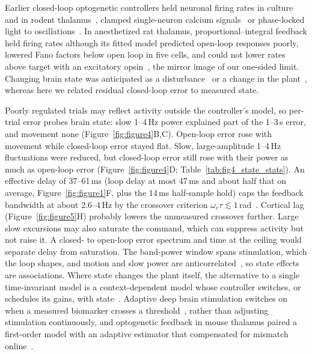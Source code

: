 Earlier closed-loop optogenetic controllers held neuronal firing rates in culture and in rodent thalamus~\citep{newman2015optogenetic,bolus2018design,bolus2021state}, clamped single-neuron calcium signals~\citep{Zhang2018} or phase-locked light to oscillations~\citep{nicholson2018analogue,kanta2019closed,Zaaimi2022}.
In anesthetized rat thalamus, proportional--integral feedback held firing rates although its fitted model predicted open-loop responses poorly, lowered Fano factors below open loop in five cells, and could not lower rates above target with an excitatory opsin~\citep{bolus2018design}, the mirror image of our one-sided limit.
Changing brain state was anticipated as a disturbance~\citep{bolus2021state} or a change in the plant~\citep{grosenick2015closed}, whereas here we related residual closed-loop error to measured state.

Poorly regulated trials may reflect activity outside the controller's model, so per-trial error probes brain state: slow 1--4\,Hz power explained part of the 1--3\,s error, and movement none (Figure~\ref{fig:figure4}B,C).
Open-loop error rose with movement while closed-loop error stayed flat.
Slow, large-amplitude 1--4\,Hz fluctuations were reduced, but closed-loop error still rose with their power as much as open-loop error (Figure~\ref{fig:figure4}D; Table~\ref{tab:fig4_state_stats}).
An effective delay of 37--61\,ms (loop delay at most 47\,ms and about half that on average, Figure~\ref{fig:figure1}F, plus the 14\,ms half-sample hold) caps the feedback bandwidth at about 2.6--4\,Hz by the crossover criterion $\omega_c\tau \lesssim 1$\,rad~\citep{skogestad2005multivariable}.
Cortical lag (Figure~\ref{fig:figure5}H) probably lowers the unmeasured crossover further.
Large slow excursions may also saturate the command, which can suppress activity but not raise it.
A closed- to open-loop error spectrum and time at the ceiling would separate delay from saturation.
The band-power window spans stimulation, which the loop shapes, and motion and slow power are anticorrelated~\citep{McGinley2015waking}, so state effects are associations.
Where state changes the plant itself, the alternative to a single time-invariant model is a context-dependent model whose controller switches, or schedules its gains, with state~\citep{rugh2000research,grosenick2015closed}.
Adaptive deep brain stimulation switches on when a measured biomarker crosses a threshold~\citep{little2013adaptive}, rather than adjusting stimulation continuously, and optogenetic feedback in mouse thalamus paired a first-order model with an adaptive estimator that compensated for mismatch online~\citep{bolus2021state}.

